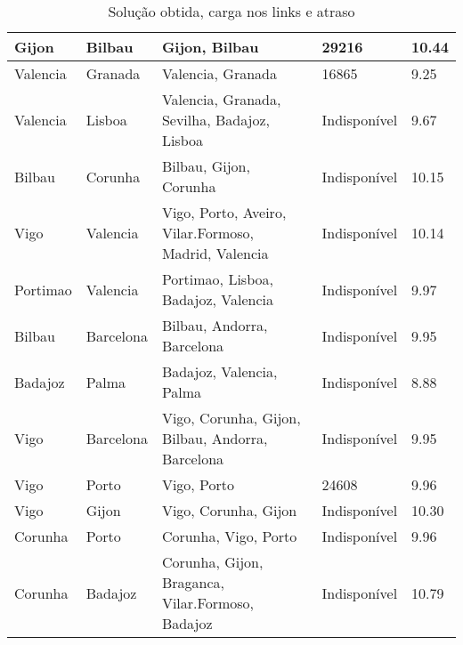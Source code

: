 \begin{table}[!htb]
{\begin{tabular}{|l|l|l|l|l|}
Gijon & Bilbau & Gijon, Bilbau & 29216 & 10.44 \\ \hline
Valencia & Granada & Valencia, Granada & 16865 & 9.25 \\ \hline
Valencia & Lisboa & Valencia, Granada, Sevilha, Badajoz, Lisboa & Indisponível & 9.67 \\ \hline
Bilbau & Corunha & Bilbau, Gijon, Corunha & Indisponível & 10.15 \\ \hline
Vigo & Valencia & Vigo, Porto, Aveiro, Vilar.Formoso, Madrid, Valencia & Indisponível & 10.14 \\ \hline
Portimao & Valencia & Portimao, Lisboa, Badajoz, Valencia & Indisponível & 9.97 \\ \hline
Bilbau & Barcelona & Bilbau, Andorra, Barcelona & Indisponível & 9.95 \\ \hline
Badajoz & Palma & Badajoz, Valencia, Palma & Indisponível & 8.88 \\ \hline
Vigo & Barcelona & Vigo, Corunha, Gijon, Bilbau, Andorra, Barcelona & Indisponível & 9.95 \\ \hline
Vigo & Porto & Vigo, Porto & 24608 & 9.96 \\ \hline
Vigo & Gijon & Vigo, Corunha, Gijon & Indisponível & 10.30 \\ \hline
Corunha & Porto & Corunha, Vigo, Porto & Indisponível & 9.96 \\ \hline
Corunha & Badajoz & Corunha, Gijon, Braganca, Vilar.Formoso, Badajoz & Indisponível & 10.79 \\ \hline
\end{tabular}}
\caption[]{Solução obtida, carga nos links e atraso}
\end{table}

